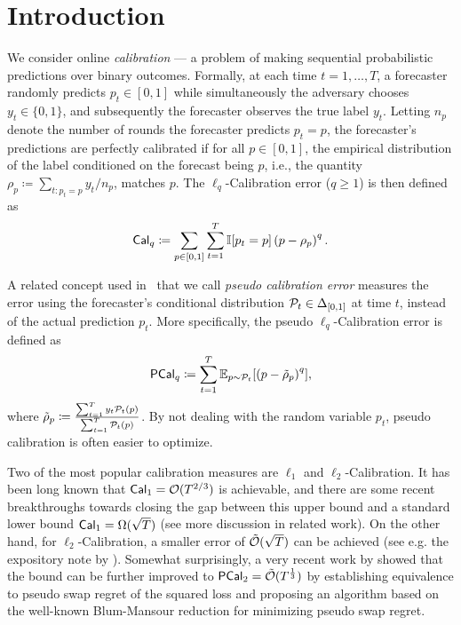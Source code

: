 \section{Introduction}\label{sec:intro}
We consider online \textit{calibration} 
--- a problem of making sequential probabilistic predictions over binary outcomes. Formally, at each time $t = 1, \dots, T$, a forecaster randomly predicts $p_{t} \in [0, 1]$ while simultaneously the adversary chooses $y_{t} \in \{0, 1\}$, and subsequently the forecaster observes the true label $y_{t}$. Letting $n_{p}$ denote the number of rounds the forecaster predicts $p_{t} = p$, the forecaster's predictions are perfectly calibrated if for all $p \in [0, 1]$, the empirical distribution of the label conditioned on the forecast being $p$, i.e., the quantity $\rho_{p} \coloneqq \sum_{t: p_{t} = p} y_{t} / n_{p}$, matches $p$. The $\ell_{q}$-Calibration error ($q \ge 1$) is then defined as \begin{equation}\label{eq:ell_2_cal}
    \cal_{q} \coloneqq \sum_{p \in [0, 1]} \sum_{t = 1} ^ {T} \ind{p_{t} = p} \bigc{p - \rho_p} ^ q. 
\end{equation}

A related concept used in~\citet{fishelsonfull} that we call \textit{pseudo calibration error} measures the error using the forecaster's conditional distribution $\cP_{t} \in \Delta_{[0, 1]}$ at time $t$, instead of the actual prediction $p_t$. More specifically, the pseudo $\ell_{q}$-Calibration error is defined as \begin{align}\label{eq:pseudo_ell_2_cal}
    \pcal_{q} \coloneqq \sum_{t = 1} ^ {T} \mathbb{E}_{p\sim\cP_{t}}[ \bigc{p -  \tilde{\rho}_{p} } ^ {q}],
\end{align} 
where $\tilde{\rho}_{p} \coloneqq \frac{\sum_{t = 1} ^ {T} y_{t} \cP_{t}(p)}{\sum_{t = 1} ^ {T} \cP_{t}(p)}$.
By not dealing with the random variable $p_t$, pseudo calibration is often easier to optimize.

Two of the most popular calibration measures are $\ell_{1}$ and $\ell_{2}$-Calibration. 
It has been long known that $\cal_1 = \cO(T^{2/3})$ is achievable, and there are some recent breakthroughs towards 
closing the gap between this upper bound and a standard lower bound $\cal_1 = \Omega(\sqrt{T})$ (see more discussion in related work).
On the other hand, for $\ell_{2}$-Calibration, a smaller error of $\tilde{\cO}(\sqrt{T})$ can be achieved (see e.g. the expository note by \citet{roth2022uncertain}). 
Somewhat surprisingly, a very recent work by \cite{fishelsonfull} showed that the bound can be further improved to $\pcal_{2} = \tilde{\cO}(T^{\frac{1}{3}})$ by establishing equivalence to pseudo swap regret of the squared loss and proposing an algorithm based on the well-known Blum-Mansour reduction \citep{blum2007external} for minimizing pseudo swap regret.

